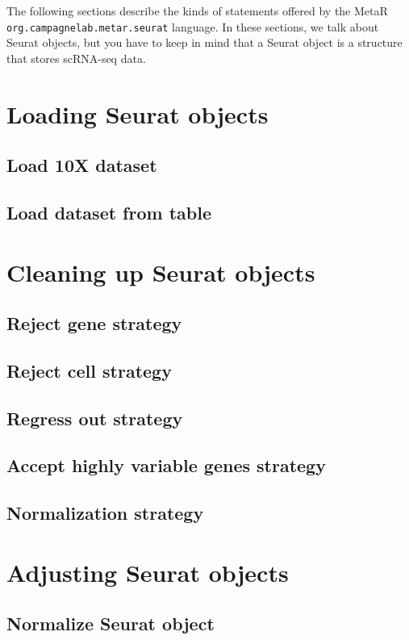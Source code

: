 \noindent The following sections describe the kinds of statements offered by the MetaR
\texttt{org\allowbreak.campagne\allowbreak{}lab\allowbreak.metar\allowbreak.seurat} language.
In these sections, we talk about Seurat objects, but you have to keep in mind that a Seurat
object is a structure that stores scRNA-seq data.

\section{Loading Seurat objects}
\subsection{Load 10X dataset}
\subsection{Load dataset from table}

\section{Cleaning up Seurat objects}
\subsection{Reject gene strategy}
\subsection{Reject cell strategy}
\subsection{Regress out strategy}
\subsection{Accept highly variable genes strategy}
\subsection{Normalization strategy}

\section{Adjusting Seurat objects}
\subsection{Normalize Seurat object}
